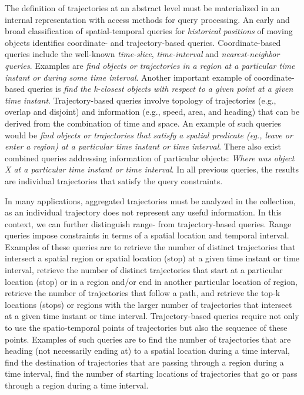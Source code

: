 \documentclass[a4paper,10pt,twoside]{book}
\begin{document}
    The definition of trajectories at an abstract level must be materialized in an internal representation with access methods for query processing. An early and broad classification of spatial-temporal queries for \textit{historical positions} of moving objects \cite{DBLP:conf/vldb/PfoserJT00} identifies coordinate- and trajectory-based queries. Coordinate-based queries include the well-known  {\it time-slice}, {\it time-interval} and \textit{nearest-neighbor queries}. Examples are \textit{find objects or trajectories in a region at a  particular time instant or during some time interval}. Another important example of coordinate-based queries is \textit{find the k-closest objects with respect to a given point at a given time instant}. Trajectory-based queries  involve topology of trajectories (e.g., overlap and disjoint) and information (e.g., speed, area, and heading) that can be derived from the combination of time and space. An example of such queries would be  \textit{find objects or trajectories that satisfy a spatial predicate (eg., leave or enter a region)  at a particular time instant or time interval}. There also exist combined queries addressing information of particular objects: \textit{Where was object X at a particular time instant or time interval}. In all previous queries, the results are individual trajectories that satisfy the query constraints.
    
    In many applications, aggregated trajectories must be analyzed in the collection, as an individual trajectory does not represent any useful information.
    In this context, we can  further distinguish range- from trajectory-based queries. Range queries impose constraints in terms of a spatial location  and temporal interval.  Examples of these queries are  to retrieve the number of distinct trajectories  that intersect a spatial region or spatial location (stop) at a given time instant or time interval, retrieve the number of distinct trajectories that start at a particular location (stop) or in a region and/or end in another particular location of region, retrieve the number of trajectories that follow a path, 
     and retrieve the  top-k locations (stops) or regions  with the larger number of  trajectories that  intersect  at a given time instant or time interval. Trajectory-based queries require not only to use the spatio-temporal points of trajectories  but also the sequence of these points. Examples of such queries are  to find the number of trajectories that are heading (not necessarily ending at) to a spatial location during a time interval, find the destination of trajectories that are passing through a region during a time interval, find the number of starting locations of  trajectories that go or pass through a region during a time interval.
	
\end{document}
